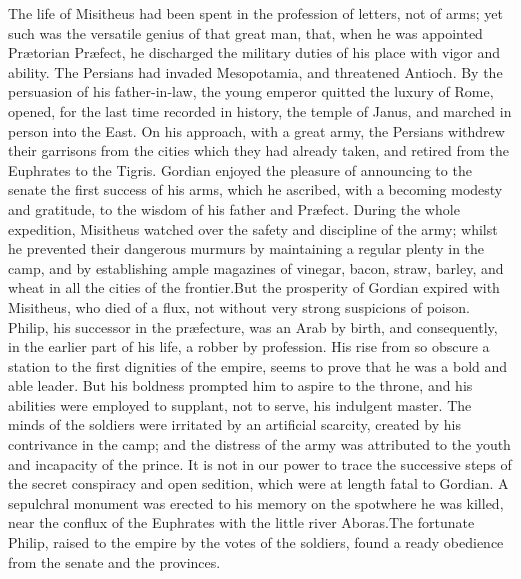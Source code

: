 The life of Misitheus had been spent in the profession of
letters, not of arms; yet such was the versatile genius of that
great man, that, when he was appointed Prætorian Præfect, he
discharged the military duties of his place with vigor and
ability. The Persians had invaded Mesopotamia, and threatened
Antioch. By the persuasion of his father-in-law, the young
emperor quitted the luxury of Rome, opened, for the last time
recorded in history, the temple of Janus, and marched in person
into the East. On his approach, with a great army, the Persians
withdrew their garrisons from the cities which they had already
taken, and retired from the Euphrates to the Tigris. Gordian
enjoyed the pleasure of announcing to the senate the first
success of his arms, which he ascribed, with a becoming modesty
and gratitude, to the wisdom of his father and Præfect. During
the whole expedition, Misitheus watched over the safety and
discipline of the army; whilst he prevented their dangerous
murmurs by maintaining a regular plenty in the camp, and by
establishing ample magazines of vinegar, bacon, straw, barley,
and wheat in all the cities of the frontier.\footnotemark[49] But the
prosperity of Gordian expired with Misitheus, who died of a flux,
not without very strong suspicions of poison. Philip, his
successor in the præfecture, was an Arab by birth, and
consequently, in the earlier part of his life, a robber by
profession. His rise from so obscure a station to the first
dignities of the empire, seems to prove that he was a bold and
able leader. But his boldness prompted him to aspire to the
throne, and his abilities were employed to supplant, not to
serve, his indulgent master. The minds of the soldiers were
irritated by an artificial scarcity, created by his contrivance
in the camp; and the distress of the army was attributed to the
youth and incapacity of the prince. It is not in our power to
trace the successive steps of the secret conspiracy and open
sedition, which were at length fatal to Gordian. A sepulchral
monument was erected to his memory on the spot\footnotemark[50] where he was
killed, near the conflux of the Euphrates with the little river
Aboras.\footnotemark[51] The fortunate Philip, raised to the empire by the
votes of the soldiers, found a ready obedience from the senate
and the provinces.\footnotemark[52]


